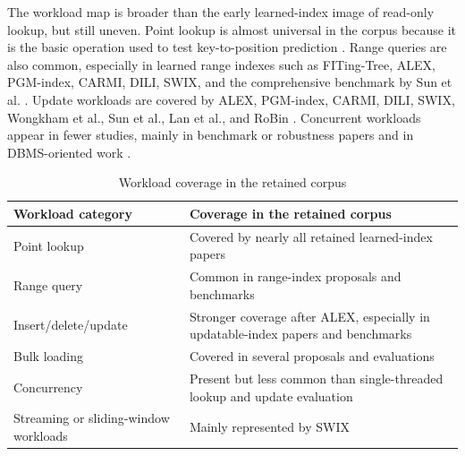 \documentclass[a4paper, 12pt, twoside]{report}
\begin{document}
The workload map is broader than the early learned-index image of read-only lookup, but still uneven. Point lookup is almost universal in the corpus because it is the basic operation used to test key-to-position prediction \cite{kraska2018,marcus2020benchmarking,sun2023learned}. Range queries are also common, especially in learned range indexes such as FITing-Tree, ALEX, PGM-index, CARMI, DILI, SWIX, and the comprehensive benchmark by Sun et al. \cite{galakatos2019fiting,ding2020alex,ferragina2020pgm,zhang2022carmi,li2023dili,liang2024swix,sun2023learned}. Update workloads are covered by ALEX, PGM-index, CARMI, DILI, SWIX, Wongkham et al., Sun et al., Lan et al., and RoBin \cite{ding2020alex,ferragina2020pgm,zhang2022carmi,li2023dili,liang2024swix,wongkham2022ready,sun2023learned,lan2023disk,luo2025robustness}. Concurrent workloads appear in fewer studies, mainly in benchmark or robustness papers and in DBMS-oriented work \cite{wongkham2022ready,sun2023learned,liang2024swix,luo2025robustness,fuad2026postlearn}.

\begin{table}[h]
\begin{center}
\begin{tabular}{|p{3.8cm}|p{8.8cm}|}
\hline
\textbf{Workload category} & \textbf{Coverage in the retained corpus} \\
\hline
Point lookup & Covered by nearly all retained learned-index papers \cite{kraska2018,marcus2020benchmarking,sun2023learned} \\
\hline
Range query & Common in range-index proposals and benchmarks \cite{galakatos2019fiting,ding2020alex,ferragina2020pgm,zhang2022carmi,sun2023learned} \\
\hline
Insert/delete/update & Stronger coverage after ALEX, especially in updatable-index papers and benchmarks \cite{ding2020alex,wongkham2022ready,sun2023learned,li2023dili,luo2025robustness} \\
\hline
Bulk loading & Covered in several proposals and evaluations \cite{galakatos2019fiting,ding2020alex,marcus2020benchmarking,sun2023learned,lan2023disk} \\
\hline
Concurrency & Present but less common than single-threaded lookup and update evaluation \cite{wongkham2022ready,sun2023learned,liang2024swix,luo2025robustness,fuad2026postlearn} \\
\hline
Streaming or sliding-window workloads & Mainly represented by SWIX \cite{liang2024swix} \\
\hline
\end{tabular}
\end{center}
\caption{Workload coverage in the retained corpus}
\label{tab:workload-map}
\end{table}
\end{document}
